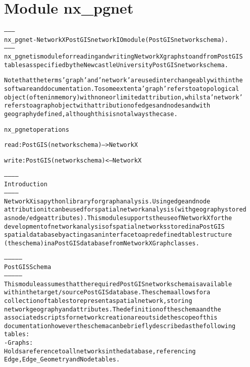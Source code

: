 %
%
%


\section{Module nx\_pgnet}

    \label{nx_pgnet}
\begin{alltt}

--------
nx\_pgnet - NetworkX PostGIS network IO module (PostGIS network schema).
--------
nx\_pgnet is module for reading and writing NetworkX graphs to and from PostGIS 
tables as specified by the Newcastle University PostGIS network schema.

Note that the terms 'graph' and 'network' are used interchangeably within the 
software and documentation. To some extent a 'graph' refers to a topological 
object (often in memory) with none or limited attribution, whilst a 'network' 
refers to a graph object with attribution of edges and nodes and with 
geography defined, although this is not always the case.

nx\_pgnet operations

read: PostGIS (network schema) --{\textgreater} NetworkX

write: PostGIS (network schema) {\textless}-- NetworkX    

------------
Introduction
------------
NetworkX is a python library for graph analysis. Using edge and node 
attribution it can be used for spatial network analysis (with geography stored 
as node/edge attributes). This module supports the use of NetworkX for the
development of network analysis of spatial networks stored in a PostGIS 
spatial database by acting as an interface to a predefined table structure 
(the schema) in a PostGIS database from NetworkX Graph classes.

--------------
PostGIS Schema
--------------
This module assumes that the required PostGIS network schema is available 
within the target/source PostGIS database. The schema allows for a
collection of tables to represent a spatial network, storing
network geography and attributes. The definition of the schema and the 
associated scripts for network creation are outside the scope of this 
documentation however the schema can be briefly described as the following 
tables:
    - Graphs:
        Holds a reference to all networks in the database, referencing
        Edge, Edge\_Geometry and Node tables.


\end{alltt}
